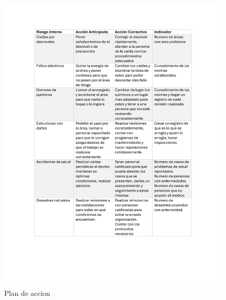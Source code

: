\begin{figure}[H]
    \centering
    \includegraphics[scale=0.3]{13/img/planDeAccion.pdf}
    \caption{Plan de accion }
\end{figure}
